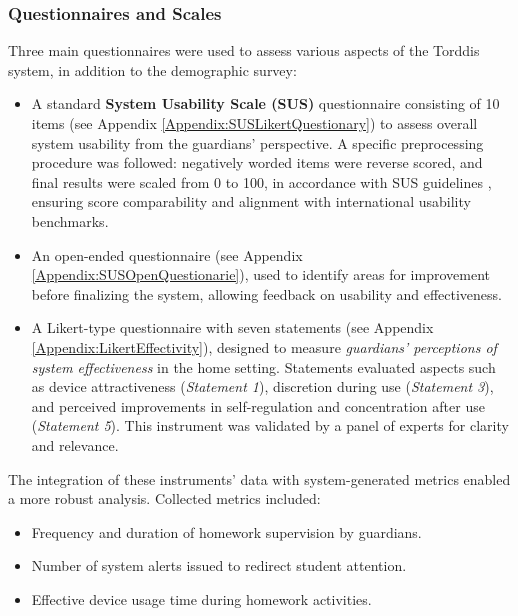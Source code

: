                 \subsubsection{Questionnaires and Scales}
                Three main questionnaires were used to assess various aspects of the Torddis system, in addition to the demographic survey:
                
                \begin{itemize}
                    \item A standard \textbf{System Usability Scale (SUS)} questionnaire consisting of 10 items (see Appendix \ref{Appendix:SUSLikertQuestionary}) to assess overall system usability from the guardians’ perspective. A specific preprocessing procedure was followed: negatively worded items were reverse scored, and final results were scaled from 0 to 100, in accordance with SUS guidelines \citep{Brown1989}, ensuring score comparability and alignment with international usability benchmarks.
                    
                    \item An open-ended questionnaire (see Appendix \ref{Appendix:SUSOpenQuestionarie}), used to identify areas for improvement before finalizing the system, allowing feedback on usability and effectiveness.
                    
                    \item A Likert-type questionnaire with seven statements (see Appendix \ref{Appendix:LikertEffectivity}), designed to measure \textit{guardians’ perceptions of system effectiveness} in the home setting. Statements evaluated aspects such as device attractiveness (\textit{Statement 1}), discretion during use (\textit{Statement 3}), and perceived improvements in self-regulation and concentration after use (\textit{Statement 5}). This instrument was validated by a panel of experts for clarity and relevance.
                \end{itemize}
                
                The integration of these instruments’ data with system-generated metrics enabled a more robust analysis. Collected metrics included:
                
                \begin{itemize}
                    \item Frequency and duration of homework supervision by guardians.
                    
                    \item Number of system alerts issued to redirect student attention.
                    
                    \item Effective device usage time during homework activities.
                \end{itemize}
                

